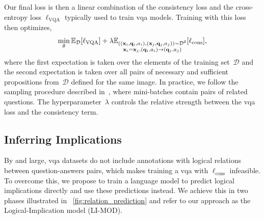 Our final loss is then a linear combination of the consistency loss and the cross-entropy loss $\ell_{\textrm{VQA}}$ typically used to train \gls{vqa} models. Training with this loss then optimizes, 
\begin{equation}
    \min_\theta \mathbb{E}_{\mathcal{D}}[\ell_{\textrm{VQA}}] +
    \lambda\mathbb{E}_{\substack{((\mathbf{x}_i, \mathbf{q}_i, a_i), (\mathbf{x}_j, \mathbf{q}_j, a_j))\sim\mathcal{D}^2 \\ \mathbf{x}_i=\mathbf{x}_j, (\mathbf{q}_i, a_i)\rightarrow (\mathbf{q}_j, a_j)}}[\ell_{\textrm{cons}}],
\end{equation}
where the first expectation is taken over the elements of the training set~$\mathcal{D}$ and the second expectation is taken over all pairs of necessary and sufficient propositions from~$\mathcal{D}$ defined for the same image.
In practice, we follow the sampling procedure described in~\cite{selvaraju2020squinting,tascon2022consistency}, where mini-batches contain pairs of related questions. The hyperparameter~$\lambda$ controls the relative strength between the \gls{vqa} loss and the consistency term. %


\subsection{Inferring Implications}
\label{subsec:relation_prediction}
By and large, \gls{vqa} datasets do not include annotations with logical relations between question-answers pairs, which makes training a \gls{vqa} with $\ell_{\textrm{cons}}$ infeasible. To overcome this, we propose to train a language model to predict logical implications directly and use these predictions instead. We achieve this in two phases illustrated in \fig~\ref{fig:relation_prediction} and refer to our approach as the Logical-Implication model (LI-MOD).

